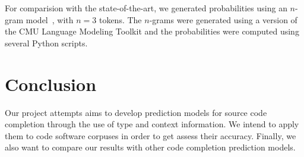 \documentclass{article} %
\begin{document}
For comparision with the state-of-the-art, we generated probabilities using an $n$-gram model~\cite{Hindle:2012:NS:2337223.2337322}, with $n = 3$ tokens. The $n$-grams were generated using a version of the CMU Language Modeling Toolkit and the probabilities were computed using several Python scripts.

\section*{Conclusion}

Our project attempts aims to develop prediction models for source code completion through the use of type and context information. We intend to apply them to code software corpuses in order to get assess their accuracy. Finally, we also want to compare our results with other code completion prediction models.




\end{document}
